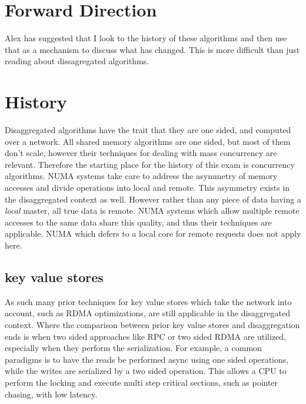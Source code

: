 

%
\section{Forward Direction}

Alex has suggested that I look to the history of these algorithms and then use
that as a mechanism to discuss what has changed. This is more difficult than
just reading about dissagregated algorithms.


\section{History}

Disaggregated algorithms have the trait that they are one sided, and computed
over a network. All shared memory algorithms are one sided, but most of them
don't scale, however their techniques for dealing with mass concurrency are
relevant. Therefore the starting place for the history of this exam is
concurrency algorithms. NUMA systems take care to address the asymmetry of
memory accesses and divide operations into local and remote. This asymmetry
exists in the disaggregated context as well. However rather than any piece of
data having a \textit{local} master, all true data is remote. NUMA systems which
allow multiple remote accesses to the same data share this quality, and thus
their techniques are applicable. NUMA which defers to a local core for remote
requests does not apply here.

\subsection{key value stores} As such many prior techniques for key value stores
which take the network into account, such as RDMA optimizations, are still
applicable in the disaggregated context. Where the comparison between prior key
value stores and disaggregation ends is when two sided approaches like RPC or
two sided RDMA are utilized, especially when they perform the serialization. For
example, a common paradigms is to have the reads be performed async using one
sided operations, while the writes are serialized by a two sided operation. This
allows a CPU to perform the locking and execute multi step critical sections,
such as pointer chasing, with low latency.

